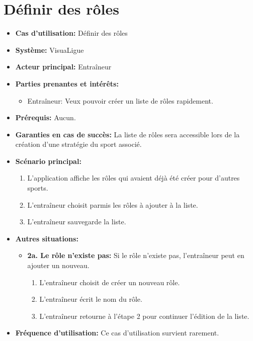 \section{Définir des rôles}
\label{sec:definir_des_roles}

\begin{itemize}
    \item \textbf{Cas d'utilisation:} D\'efinir des r\^oles
    \item \textbf{Syst\`eme:} VisuaLigue
    \item \textbf{Acteur principal:} Entra\^ineur
    \item \textbf{Parties prenantes et int\'er\^ets:}
        \begin{itemize}
            \item Entraîneur: Veux pouvoir créer un liste de rôles rapidement.
        \end{itemize}
    \item \textbf{Pr\'erequis:} Aucun.
    \item \textbf{Garanties en cas de succ\`es:} La liste de rôles sera accessible lors de la création d'une stratégie du sport associé.
    \item \textbf{Sc\'enario principal:}
        \begin{enumerate}
            \item L'application affiche les rôles qui avaient déjà été créer pour d'autres sports.
            \item L'entraîneur choisit parmis les rôles à ajouter à la liste.
            \item L'entraîneur sauvegarde la liste.
        \end{enumerate}
    \item \textbf{Autres situations:}
        \begin{itemize}
            \item \textbf{2a. Le rôle n'existe pas:} Si le rôle n'existe pas, l'entraîneur peut en ajouter un nouveau.
                \begin{enumerate}
                    \item L'entraîneur choisit de créer un nouveau rôle.
                    \item L'entraîneur écrit le nom du rôle.
                    \item L'entraîneur retourne à l'étape 2 pour continuer l'édition de la liste.
                \end{enumerate}
        \end{itemize}
    \item \textbf{Fréquence d'utilisation:} Ce cas d'utilisation survient rarement.
\end{itemize}



